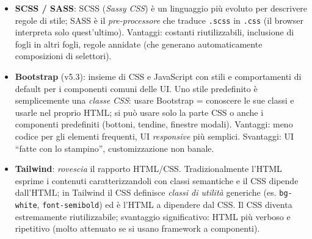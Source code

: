\begin{itemize}
  \item \textbf{SCSS / SASS}: SCSS (\emph{Sassy CSS}) \`e un linguaggio pi\`u evoluto per
        descrivere regole di stile; SASS \`e il \emph{pre-processore} che traduce
        \texttt{.scss} in \texttt{.css} (il browser interpreta solo quest'ultimo). Vantaggi:
        costanti riutilizzabili, inclusione di fogli in altri fogli, regole annidate (che
        generano automaticamente composizioni di selettori).
  \item \textbf{Bootstrap} (v5.3): insieme di CSS e JavaScript con stili e comportamenti di
        default per i componenti comuni delle UI. Uno stile predefinito \`e semplicemente una
        \emph{classe CSS}: usare Bootstrap = conoscere le sue classi e usarle nel proprio
        HTML; si pu\`o usare solo la parte CSS o anche i componenti predefiniti (bottoni,
        tendine, finestre modali). Vantaggi: meno codice per gli elementi frequenti, UI
        \emph{responsive} pi\`u semplici. Svantaggi: UI ``fatte con lo stampino'',
        customizzazione non banale.
  \item \textbf{Tailwind}: \emph{rovescia} il rapporto HTML/CSS. Tradizionalmente l'HTML
        esprime i contenuti caratterizzandoli con classi semantiche e il CSS dipende
        dall'HTML; in Tailwind il CSS definisce \emph{classi di utilit\`a} generiche
        (es. \texttt{bg-white}, \texttt{font-semibold}) ed \`e l'HTML a dipendere dal CSS.
        Il CSS diventa estremamente riutilizzabile; svantaggio significativo: HTML pi\`u
        verboso e ripetitivo (molto attenuato se si usano framework a componenti).
\end{itemize}
